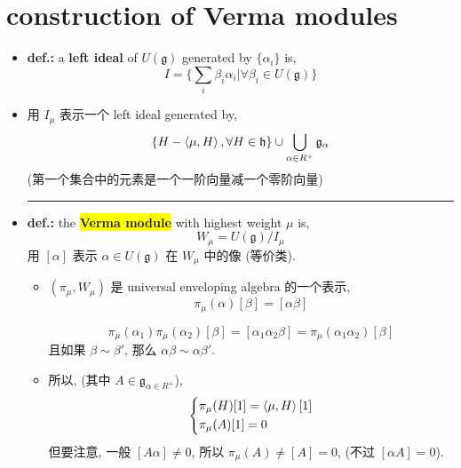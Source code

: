 \section{construction of Verma modules}
\begin{itemize}
	\item \textbf{def.:} a \textbf{left ideal} of $U(\mathfrak{g})$ generated by $\{\alpha_i\}$ is,
	\begin{equation}
		I = \Big\{ \sum_i \beta_i \alpha_i \Big| \forall \beta_i \in U(\mathfrak{g}) \Big\}
	\end{equation}
	
	\item 用 $I_\mu$ 表示一个 left ideal generated by,
	\begin{equation} \label{8.5.2}
		\{H - \braket{\mu, H}, \forall H \in \mathfrak{h}\} \cup \bigcup_{\alpha \in R^+} \mathfrak{g}_\alpha
	\end{equation}
	(第一个集合中的元素是一个一阶向量减一个零阶向量)
	
	\noindent\rule[0.5ex]{\linewidth}{0.5pt} %
	
	\item \textbf{def.:} the \colorbox{yellow}{\textbf{Verma module}} with highest weight $\mu$ is,
	\begin{equation}
		W_\mu = U(\mathfrak{g}) / I_\mu
	\end{equation}
	用 $[\alpha]$ 表示 $\alpha \in U(\mathfrak{g})$ 在 $W_\mu$ 中的像 (等价类).
	\begin{itemize}
		\item $(\pi_\mu, W_\mu)$ 是 universal enveloping algebra 的一个表示,
		\begin{equation}
			\pi_\mu(\alpha) [\beta] = [\alpha \beta]
		\end{equation}
		
		\begin{tcolorbox}[title=proof:]
			\begin{equation}
				\pi_\mu(\alpha_1) \pi_\mu(\alpha_2) [\beta] = [\alpha_1 \alpha_2 \beta] = \pi_\mu(\alpha_1 \alpha_2) [\beta]
			\end{equation}
			且如果 $\beta \sim \beta'$, 那么 $\alpha \beta \sim \alpha \beta'$.
		\end{tcolorbox}
		
		\item 所以, (其中 $A \in \mathfrak{g}_{\alpha \in R^+}$),
		\begin{equation}
			\begin{dcases} \label{8.5.6}
				\pi_\mu(H) [1] = \braket{\mu, H} [1] \\
				\pi_\mu(A) [1] = 0
			\end{dcases}
		\end{equation}
		但要注意, 一般 $[A \alpha] \neq 0$, 所以 $\pi_\mu(A) \neq [A] = 0$, (不过 $[\alpha A] = 0$).
	\end{itemize}
	

\end{itemize}
